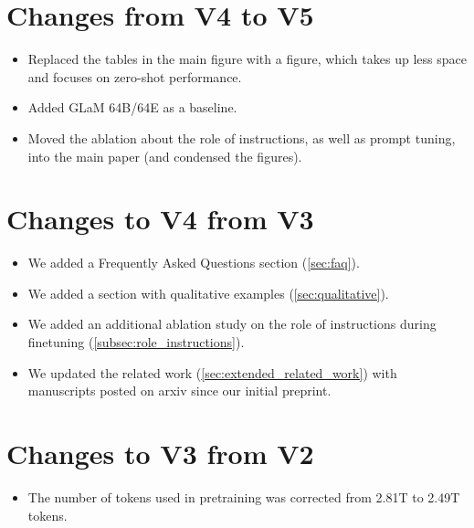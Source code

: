 \documentclass{article} %
\begin{document}
\clearpage
\section*{Changes from V4 to V5}
\begin{itemize}
    \item Replaced the tables in the main figure with a figure, which takes up less space and focuses on zero-shot performance. \item Added GLaM 64B/64E as a baseline.
    \item Moved the ablation about the role of instructions, as well as prompt tuning, into the main paper (and condensed the figures).
\end{itemize}

\section*{Changes to V4 from V3}
\begin{itemize}
    \item We added a Frequently Asked Questions section (\cref{sec:faq}).
    \item We added a section with qualitative examples (\cref{sec:qualitative}).
    \item We added an additional ablation study on the role of instructions during finetuning (\cref{subsec:role_instructions}).
    \item We updated the related work (\cref{sec:extended_related_work}) with manuscripts posted on arxiv since our initial preprint.
\end{itemize}

\section*{Changes to V3 from V2}
\begin{itemize}
    \item The number of tokens used in pretraining was corrected from 2.81T to 2.49T tokens.
\end{itemize}
\end{document}
